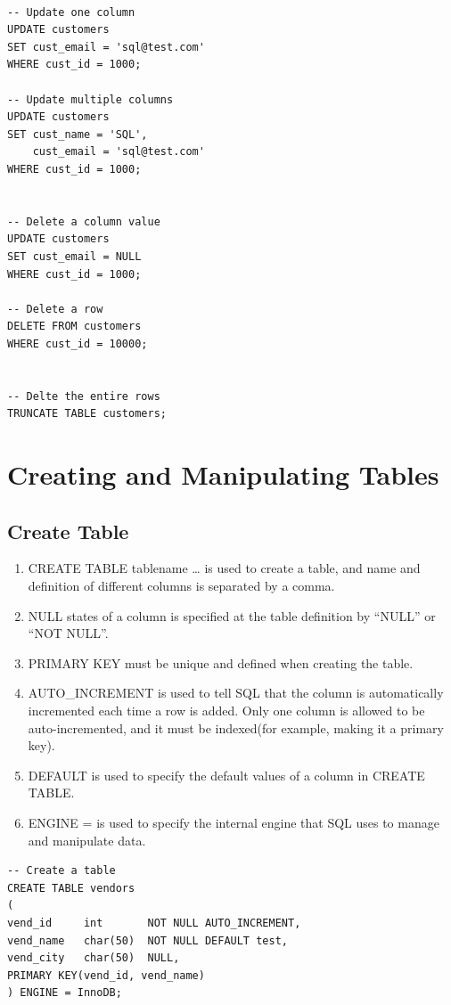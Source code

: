 \documentclass[12pt,oneside,a4paper]{article}
\begin{document}
\begin{lstlisting}

-- Update one column 
UPDATE customers
SET cust_email = 'sql@test.com'
WHERE cust_id = 1000;

-- Update multiple columns
UPDATE customers
SET cust_name = 'SQL',
    cust_email = 'sql@test.com'
WHERE cust_id = 1000;


-- Delete a column value 
UPDATE customers
SET cust_email = NULL
WHERE cust_id = 1000;

-- Delete a row 
DELETE FROM customers 
WHERE cust_id = 10000;


-- Delte the entire rows 
TRUNCATE TABLE customers;  
\end{lstlisting}


\section{Creating and Manipulating Tables}

\subsection{Create Table}
\begin{enumerate}
\item \textsf{CREATE TABLE tablename \ldots} is used to create a table, and name and definition of different columns is separated by a comma. 

\item NULL states of a column is specified at the table definition by ``NULL'' or ``NOT NULL''. 

\item PRIMARY KEY must be unique and defined when creating the table.

\item \textsf{AUTO\_INCREMENT} is used to tell SQL that the column is automatically incremented each time a row is added. Only one column is allowed to be auto-incremented, and it must be indexed(for example, making it a primary key).

\item \textsf{DEFAULT} is used to specify the default values of a column in \textsf{CREATE TABLE}. 

\item \textsf{ENGINE = } is used to specify the internal engine that SQL uses to manage and manipulate data. 
\end{enumerate}

\begin{lstlisting}
-- Create a table 
CREATE TABLE vendors 
(
vend_id     int       NOT NULL AUTO_INCREMENT,
vend_name   char(50)  NOT NULL DEFAULT test,
vend_city   char(50)  NULL, 
PRIMARY KEY(vend_id, vend_name)
) ENGINE = InnoDB;
\end{lstlisting}
\end{document}
